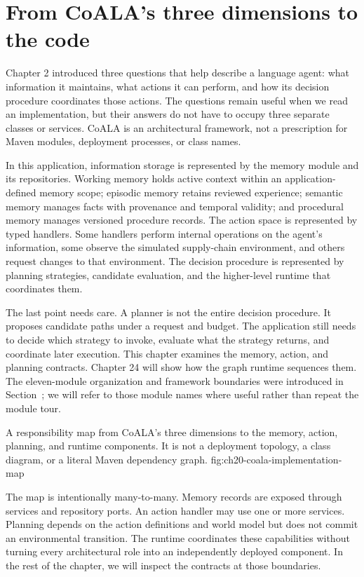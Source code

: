\section{From CoALA's three dimensions to the code}
\label{sec:ch20-coala-map}

Chapter 2 introduced three questions that help describe a language agent: what information it maintains, what actions it can perform, and how its decision procedure coordinates those actions. The questions remain useful when we read an implementation, but their answers do not have to occupy three separate classes or services. CoALA is an architectural framework, not a prescription for Maven modules, deployment processes, or class names.

In this application, information storage is represented by the memory module and its repositories. Working memory holds active context within an application-defined memory scope; episodic memory retains reviewed experience; semantic memory manages facts with provenance and temporal validity; and procedural memory manages versioned procedure records. The action space is represented by typed handlers. Some handlers perform internal operations on the agent's information, some observe the simulated supply-chain environment, and others request changes to that environment. The decision procedure is represented by planning strategies, candidate evaluation, and the higher-level runtime that coordinates them.

The last point needs care. A planner is not the entire decision procedure. It proposes candidate paths under a request and budget. The application still needs to decide which strategy to invoke, evaluate what the strategy returns, and coordinate later execution. This chapter examines the memory, action, and planning contracts. Chapter 24 will show how the graph runtime sequences them. The eleven-module organization and framework boundaries were introduced in Section~\ChapterNineteenModulesRef; we will refer to those module names where useful rather than repeat the module tour.

  {A responsibility map from CoALA's three dimensions to the memory, action, planning, and runtime components. It is not a deployment topology, a class diagram, or a literal Maven dependency graph.}
  {fig:ch20-coala-implementation-map}

The map is intentionally many-to-many. Memory records are exposed through services and repository ports. An action handler may use one or more services. Planning depends on the action definitions and world model but does not commit an environmental transition. The runtime coordinates these capabilities without turning every architectural role into an independently deployed component. In the rest of the chapter, we will inspect the contracts at those boundaries.


